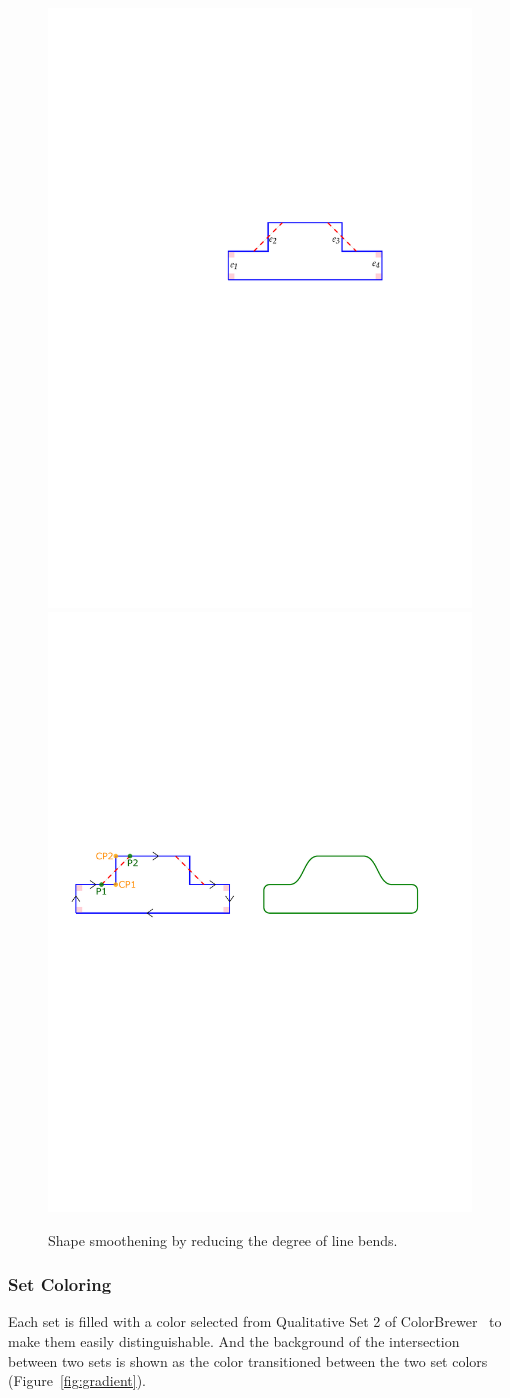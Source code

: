 \begin{figure}[!htb]
	\centering
	{\includegraphics[width=.47\columnwidth]{figure6a}}
	\hfill
	{\includegraphics[width=.47\columnwidth]{figure6b}}
	\caption{Shape smoothening by reducing the degree of line bends.}
	\label{fig:generation}
\end{figure}

\subsubsection{Set Coloring}
Each set is filled with a color selected from Qualitative Set 2 of ColorBrewer~\cite{Harrower2003} to make them easily distinguishable. And the background of the intersection between two sets is shown as the color transitioned between the two set colors (Figure~\ref{fig:gradient}).


